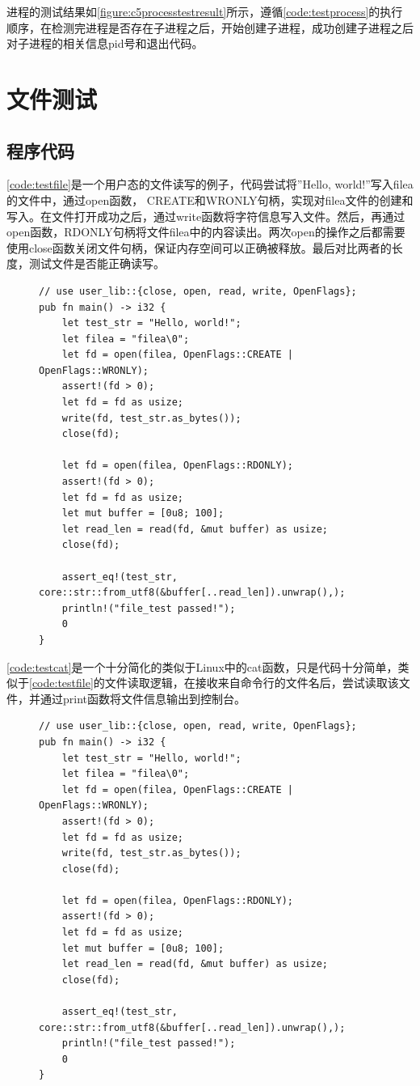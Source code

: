 进程的测试结果如\autoref{figure:c5processtestresult}所示，遵循\autoref{code:testprocess}的执行顺序，在检测完进程是否存在子进程之后，开始创建子进程，成功创建子进程之后对子进程的相关信息pid号和退出代码。

\section{文件测试}
\subsection{程序代码}
\autoref{code:testfile}是一个用户态的文件读写的例子，代码尝试将”Hello, world!”写入filea的文件中，通过open函数， CREATE和WRONLY句柄，实现对filea文件的创建和写入。在文件打开成功之后，通过write函数将字符信息写入文件。然后，再通过open函数，RDONLY句柄将文件filea中的内容读出。两次open的操作之后都需要使用close函数关闭文件句柄，保证内存空间可以正确被释放。最后对比两者的长度，测试文件是否能正确读写。
\begin{figure}[h]
\begin{lstlisting}[caption=用户态文件读写的测试代码, label=code:testfile]
// use user_lib::{close, open, read, write, OpenFlags};
pub fn main() -> i32 {
    let test_str = "Hello, world!";
    let filea = "filea\0";
    let fd = open(filea, OpenFlags::CREATE | OpenFlags::WRONLY);
    assert!(fd > 0);
    let fd = fd as usize;
    write(fd, test_str.as_bytes());
    close(fd);

    let fd = open(filea, OpenFlags::RDONLY);
    assert!(fd > 0);
    let fd = fd as usize;
    let mut buffer = [0u8; 100];
    let read_len = read(fd, &mut buffer) as usize;
    close(fd);

    assert_eq!(test_str, core::str::from_utf8(&buffer[..read_len]).unwrap(),);
    println!("file_test passed!");
    0
}
\end{lstlisting}
\end{figure}

\autoref{code:testcat}是一个十分简化的类似于Linux中的cat函数，只是代码十分简单，类似于\autoref{code:testfile}的文件读取逻辑，在接收来自命令行的文件名后，尝试读取该文件，并通过print函数将文件信息输出到控制台。
\begin{figure}[h]
\begin{lstlisting}[caption=用户态小程序cat, label=code:testcat]
// use user_lib::{close, open, read, write, OpenFlags};
pub fn main() -> i32 {
    let test_str = "Hello, world!";
    let filea = "filea\0";
    let fd = open(filea, OpenFlags::CREATE | OpenFlags::WRONLY);
    assert!(fd > 0);
    let fd = fd as usize;
    write(fd, test_str.as_bytes());
    close(fd);

    let fd = open(filea, OpenFlags::RDONLY);
    assert!(fd > 0);
    let fd = fd as usize;
    let mut buffer = [0u8; 100];
    let read_len = read(fd, &mut buffer) as usize;
    close(fd);

    assert_eq!(test_str, core::str::from_utf8(&buffer[..read_len]).unwrap(),);
    println!("file_test passed!");
    0
}
\end{lstlisting}
\end{figure}

